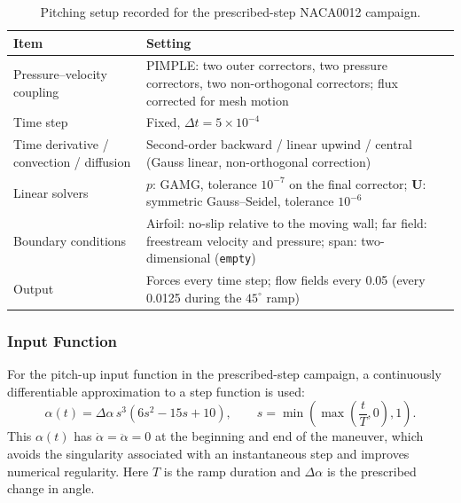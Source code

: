 \begin{table}[htbp]\centering\small
\caption{Pitching setup recorded for the prescribed-step NACA0012 campaign.}\label{tab:pitch_solver}
\begin{tabularx}{\linewidth}{@{}>{\raggedright\arraybackslash}p{.28\linewidth}X@{}}
\toprule Item & Setting \\
\midrule
Pressure--velocity coupling & PIMPLE: two outer correctors, two pressure correctors, two non-orthogonal correctors; flux corrected for mesh motion \\
Time step & Fixed, $\Delta t=5\times10^{-4}$ \\
Time derivative / convection / diffusion & Second-order backward / linear upwind / central (Gauss linear, non-orthogonal correction) \\
Linear solvers & $p$: GAMG, tolerance $10^{-7}$ on the final corrector; $\mathbf{U}$: symmetric Gauss--Seidel, tolerance $10^{-6}$ \\
Boundary conditions & Airfoil: no-slip relative to the moving wall; far field: freestream velocity and pressure; span: two-dimensional (\texttt{empty}) \\
Output & Forces every time step; flow fields every 0.05 (every 0.0125 during the $45^\circ$ ramp) \\
\bottomrule
\end{tabularx}
\end{table}


\FloatBarrier
\subsubsection{Input Function}
For the pitch-up input function in the prescribed-step campaign, a continuously differentiable approximation to a step function is used:
\begin{equation}
\alpha(t)=\Delta\alpha\,s^3(6s^2-15s+10),
\qquad s=\min\!\left(\max\!\left(\frac{t}{T},0\right),1\right).
\end{equation}
This $\alpha(t)$ has $\dot\alpha=\ddot\alpha=0$ at the beginning and end of the maneuver, which avoids the singularity associated with an instantaneous step and improves numerical regularity. Here $T$ is the ramp duration and $\Delta\alpha$ is the prescribed change in angle.

